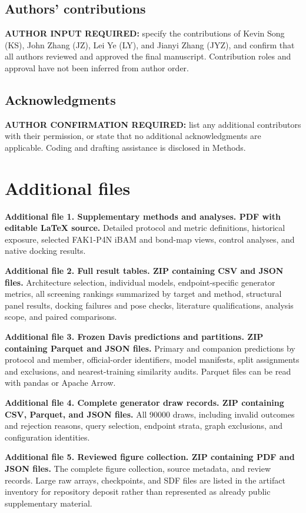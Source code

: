 \documentclass[12pt,a4paper]{article}
\begin{document}
\subsection*{Authors' contributions}
\textbf{AUTHOR INPUT REQUIRED:} specify the contributions of Kevin Song (KS), John Zhang (JZ), Lei Ye (LY), and Jianyi Zhang (JYZ), and confirm that all authors reviewed and approved the final manuscript. Contribution roles and approval have not been inferred from author order.

\subsection*{Acknowledgments}
\textbf{AUTHOR CONFIRMATION REQUIRED:} list any additional contributors with their permission, or state that no additional acknowledgments are applicable. Coding and drafting assistance is disclosed in Methods.

\section*{Additional files}
\textbf{Additional file 1. Supplementary methods and analyses. PDF with editable LaTeX source.} Detailed protocol and metric definitions, historical exposure, selected FAK1-P4N iBAM and bond-map views, control analyses, and native docking results.

\textbf{Additional file 2. Full result tables. ZIP containing CSV and JSON files.} Architecture selection, individual models, endpoint-specific generator metrics, all screening rankings summarized by target and method, structural panel results, docking failures and pose checks, literature qualifications, analysis scope, and paired comparisons.

\textbf{Additional file 3. Frozen Davis predictions and partitions. ZIP containing Parquet and JSON files.} Primary and companion predictions by protocol and member, official-order identifiers, model manifests, split assignments and exclusions, and nearest-training similarity audits. Parquet files can be read with pandas or Apache Arrow.

\textbf{Additional file 4. Complete generator draw records. ZIP containing CSV, Parquet, and JSON files.} All 90000 draws, including invalid outcomes and rejection reasons, query selection, endpoint strata, graph exclusions, and configuration identities.

\textbf{Additional file 5. Reviewed figure collection. ZIP containing PDF and JSON files.} The complete figure collection, source metadata, and review records. Large raw arrays, checkpoints, and SDF files are listed in the artifact inventory for repository deposit rather than represented as already public supplementary material.
\end{document}

